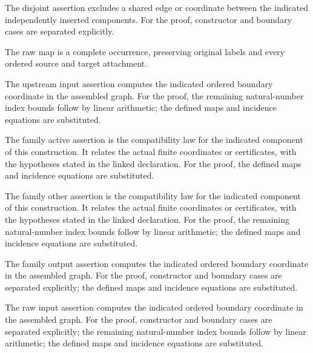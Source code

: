 The disjoint assertion excludes a shared edge or coordinate between the indicated independently inserted components.
For the proof, constructor and boundary cases are separated explicitly.
\par{}

The raw map is a complete occurrence, preserving original labels and every ordered source and target attachment.
\par{}

The upstream input assertion computes the indicated ordered boundary coordinate in the assembled graph.
For the proof, the remaining natural-number index bounds follow by linear arithmetic; the defined maps and incidence equations are substituted.
\par{}

The family active assertion is the compatibility law for the indicated component of this construction. It relates the actual finite coordinates or certificates, with the hypotheses stated in the linked declaration.
For the proof, the defined maps and incidence equations are substituted.
\par{}

The family other assertion is the compatibility law for the indicated component of this construction. It relates the actual finite coordinates or certificates, with the hypotheses stated in the linked declaration.
For the proof, the remaining natural-number index bounds follow by linear arithmetic; the defined maps and incidence equations are substituted.
\par{}

The family output assertion computes the indicated ordered boundary coordinate in the assembled graph.
For the proof, constructor and boundary cases are separated explicitly; the defined maps and incidence equations are substituted.
\par{}

The raw input assertion computes the indicated ordered boundary coordinate in the assembled graph.
For the proof, constructor and boundary cases are separated explicitly; the remaining natural-number index bounds follow by linear arithmetic; the defined maps and incidence equations are substituted.
\par{}

